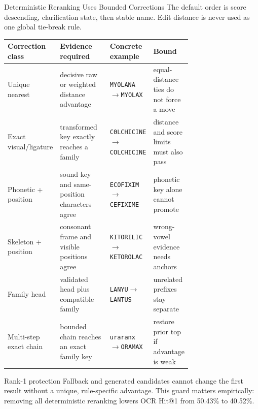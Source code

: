 \documentclass[aspectratio=169,10pt]{beamer}
\newcommand{\code}[1]{\texttt{#1}}
\begin{document}
\begin{frame}{Deterministic Reranking Uses Bounded Corrections}
\scriptsize
The default order is score descending, clarification state, then stable name.
Edit distance is never used as one global tie-break rule.

\begin{tabularx}{\linewidth}{@{}L{0.20\linewidth}L{0.30\linewidth}L{0.22\linewidth}Y@{}}
\toprule
\textbf{Correction class} & \textbf{Evidence required} & \textbf{Concrete example} & \textbf{Bound} \\
\midrule
Unique nearest & decisive raw or weighted distance advantage & \code{MYOLANA}$\rightarrow$\code{MYOLAX} & equal-distance ties do not force a move \\
Exact visual/ligature & transformed key exactly reaches a family & \code{C0LCHICINE}$\rightarrow$\code{COLCHICINE} & distance and score limits must also pass \\
Phonetic + position & sound key and same-position characters agree & \code{ECOFIXIM}$\rightarrow$\code{CEFIXIME} & phonetic key alone cannot promote \\
Skeleton + position & consonant frame and visible positions agree & \code{KITORILIC}$\rightarrow$\code{KETOROLAC} & wrong-vowel evidence needs anchors \\
Family head & validated head plus compatible family & \code{LANYU}$\rightarrow$\code{LANTUS} & unrelated prefixes stay separate \\
Multi-step exact chain & bounded chain reaches an exact family key & \code{uraranx}$\rightarrow$\code{ORAMAX} & restore prior top if advantage is weak \\
\bottomrule
\end{tabularx}

\vspace{2mm}
\begin{alertblock}{Rank-1 protection}
\scriptsize
Fallback and generated candidates cannot change the first result without a
unique, rule-specific advantage. This guard matters empirically: removing all
deterministic reranking lowers OCR Hit@1 from 50.43\% to 40.52\%.
\end{alertblock}
\end{frame}
\end{document}
